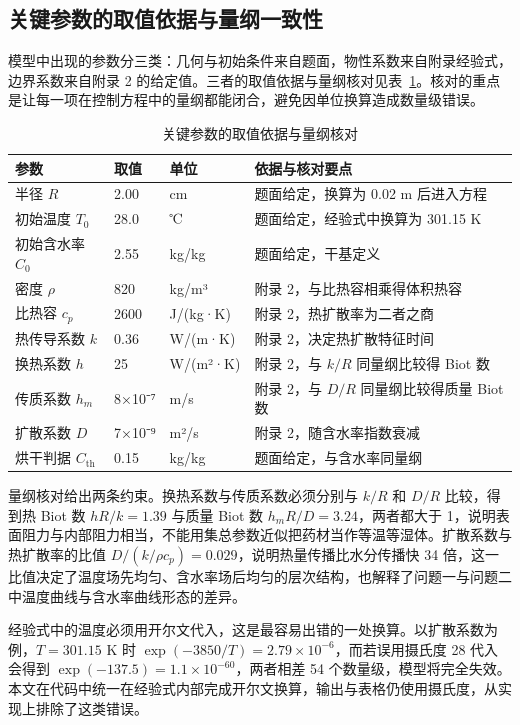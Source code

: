 \documentclass[12pt,a4paper]{article}
\begin{document}
\subsection{关键参数的取值依据与量纲一致性}

模型中出现的参数分三类：几何与初始条件来自题面，物性系数来自附录经验式，边界系数来自附录 2 的给定值。三者的取值依据与量纲核对见表~\ref{tab:param}。核对的重点是让每一项在控制方程中的量纲都能闭合，避免因单位换算造成数量级错误。

\begin{table}[H]
    \centering
    \caption{关键参数的取值依据与量纲核对}
    \begin{tabular}{llll}
        \toprule
        参数 & 取值 & 单位 & 依据与核对要点 \\
        \midrule
        半径 $R$ & 2.00 & cm & 题面给定，换算为 0.02 m 后进入方程 \\
        初始温度 $T_0$ & 28.0 & ℃ & 题面给定，经验式中换算为 301.15 K \\
        初始含水率 $C_0$ & 2.55 & kg/kg & 题面给定，干基定义 \\
        密度 $\rho$ & 820 & kg/m³ & 附录 2，与比热容相乘得体积热容 \\
        比热容 $c_p$ & 2600 & J/(kg·K) & 附录 2，热扩散率为二者之商 \\
        热传导系数 $k$ & 0.36 & W/(m·K) & 附录 2，决定热扩散特征时间 \\
        换热系数 $h$ & 25 & W/(m²·K) & 附录 2，与 $k/R$ 同量纲比较得 Biot 数 \\
        传质系数 $h_m$ & 8×10⁻⁷ & m/s & 附录 2，与 $D/R$ 同量纲比较得质量 Biot 数 \\
        扩散系数 $D$ & 7×10⁻⁹ & m²/s & 附录 2，随含水率指数衰减 \\
        烘干判据 $C_{\mathrm{th}}$ & 0.15 & kg/kg & 题面给定，与含水率同量纲 \\
        \bottomrule
    \end{tabular}
    \label{tab:param}
\end{table}

量纲核对给出两条约束。换热系数与传质系数必须分别与 $k/R$ 和 $D/R$ 比较，得到热 Biot 数 $hR/k=1.39$ 与质量 Biot 数 $h_mR/D=3.24$，两者都大于 1，说明表面阻力与内部阻力相当，不能用集总参数近似把药材当作等温等湿体。扩散系数与热扩散率的比值 $D/(k/\rho c_p)=0.029$，说明热量传播比水分传播快 34 倍，这一比值决定了温度场先均匀、含水率场后均匀的层次结构，也解释了问题一与问题二中温度曲线与含水率曲线形态的差异。

经验式中的温度必须用开尔文代入，这是最容易出错的一处换算。以扩散系数为例，$T=301.15$ K 时 $\exp(-3850/T)=2.79\times10^{-6}$，而若误用摄氏度 28 代入会得到 $\exp(-137.5)=1.1\times10^{-60}$，两者相差 54 个数量级，模型将完全失效。本文在代码中统一在经验式内部完成开尔文换算，输出与表格仍使用摄氏度，从实现上排除了这类错误。
\end{document}
